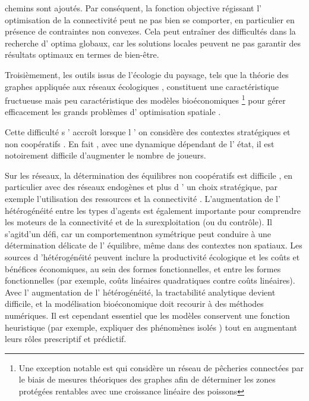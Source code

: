 \begin{displayquote}
\begin{displayquote}
\begin{displayquote}
{{{chemins sont ajoutés. Par conséquent, la fonction objective régissant l' optimisation de la connectivité peut ne pas bien se comporter, en particulier en présence de contraintes non convexes. Cela peut entraîner des difficultés dans la recherche d' optima globaux, car les solutions locales peuvent ne pas garantir des résultats optimaux en termes de bien-être. 

 Troisièmement, les outils issus de l'écologie du paysage, tels que la théorie des graphes appliquée aux réseaux écologiques , constituent une caractéristique fructueuse mais peu caractéristique des modèles bioéconomiques \citep{Drechsler20200}\footnote{Une exception notable est \cite{fabbri_competition_2022} qui considère un réseau de pêcheries connectées par le biais de mesures théoriques des graphes afin de déterminer les zones protégées rentables avec une croissance linéaire des poissons } pour gérer efficacement les grands problèmes d' optimisation spatiale .



Cette difficulté s ' accroît lorsque l ' on considère des contextes stratégiques et non coopératifs \citep{levin_social-ecological_2013}.   En fait , avec une dynamique dépendant de l' état, il est notoirement difficile d'augmenter le nombre de joueurs. 

Sur les réseaux, la détermination des équilibres non coopératifs est difficile \citep{bramoulle_strategic_2014}, en particulier avec des réseaux endogènes et plus d ' un choix stratégique, par exemple l'utilisation des ressources et la connectivité \citep{chen_multiple_2018, sadler_games_nodate}.   L'augmentation de l' hétérogénéité entre les types d'agents est également importante pour comprendre les moteurs de la connectivité et de la surexploitation (ou du contrôle).   Il s'agitd'un défi, car un comportementnon symétrique peut conduire à une détermination délicate de l' équilibre, même dans des contextes non spatiaux. Les sources d 'hétérogénéité peuvent inclure la productivité écologique et les coûts et bénéfices économiques, au sein des formes fonctionnelles, et entre les formes fonctionnelles (par exemple, coûts linéaires quadratiques contre coûts linéaires). Avec l' augmentation de l' hétérogénéité, la tractabilité analytique devient difficile, et la modélisation bioéconomique doit recourir à des méthodes numériques. Il est cependant essentiel que les modèles conservent une fonction heuristique (par exemple, expliquer des phénomènes isolés ) tout en augmentant leurs rôles prescriptif et prédictif. 

}}}
\end{displayquote}
\end{displayquote}
\end{displayquote}
